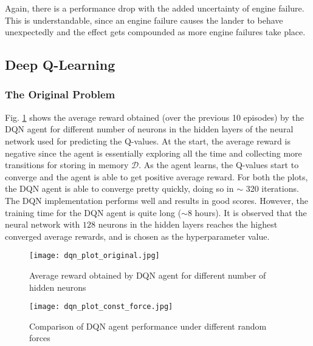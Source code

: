 \documentclass[10pt, conference]{IEEEtran}
\begin{document}
Again, there is a performance drop with the added uncertainty of engine failure. This is understandable, since an engine failure causes the lander to behave unexpectedly and the effect gets compounded as more engine failures take place. 

\subsection{Deep Q-Learning}
\subsubsection{The Original Problem}
Fig. \ref{fig:dqn_agent} shows the average reward obtained (over the previous 10 episodes) by the DQN agent for different number of neurons in the hidden layers of the neural network used for predicting the Q-values. At the start, the average reward is negative since the agent is essentially exploring all the time and collecting more transitions for storing in memory $\mathcal{D}$. As the agent learns, the Q-values start to converge and the agent is able to get positive average reward. For both the plots, the DQN agent is able to converge pretty quickly, doing so in $\sim$ 320 iterations. The DQN implementation performs well and results in good scores. However, the training time for the DQN agent is quite long ($\sim8$ hours). It is observed that the neural network with $128$ neurons in the hidden layers  reaches the highest converged average rewards, and is chosen as the hyperparameter value.

\begin{figure}[!t]
    \centering
    \texttt{[image: dqn\_plot\_original.jpg]}
    \caption{Average reward obtained by DQN agent for different number of hidden neurons}
    \label{fig:dqn_agent}
\end{figure}

\begin{figure}[!t]
    \centering
    \texttt{[image: dqn\_plot\_const\_force.jpg]}
    \caption{Comparison of DQN agent performance under different random forces}
    \label{fig:dqn_agent_const_force}
\end{figure}
\end{document}
